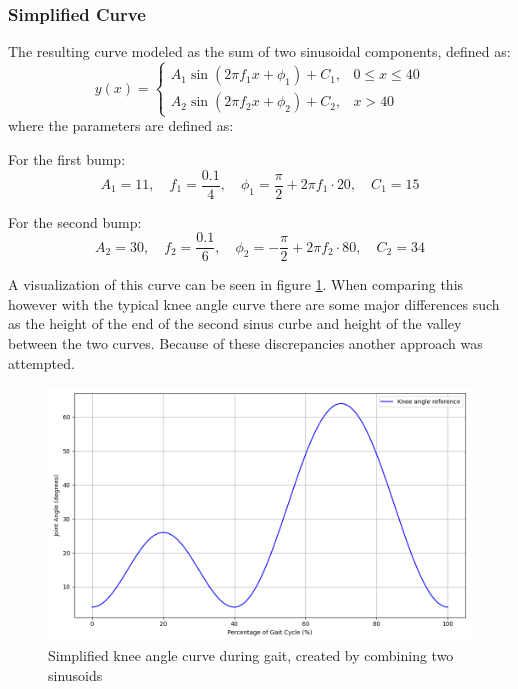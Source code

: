 \subsubsection{Simplified Curve}
The resulting curve modeled as the sum of two sinusoidal components, defined as:
\[
y(x) =
\begin{cases}
A_1 \sin\left(2 \pi f_1 x + \phi_1\right) + C_1, & 0 \leq x \leq 40 \\
A_2 \sin\left(2 \pi f_2 x + \phi_2\right) + C_2, & x > 40
\end{cases}
\]
where the parameters are defined as:

For the first bump:
\[
A_1 = 11, \quad f_1 = \frac{0.1}{4}, \quad \phi_1 = \frac{\pi}{2} + 2\pi f_1 \cdot 20, \quad C_1 = 15
\]

For the second bump:
\[
A_2 = 30, \quad f_2 = \frac{0.1}{6}, \quad \phi_2 = -\frac{\pi}{2} + 2\pi f_2 \cdot 80, \quad C_2 = 34
\]


A visualization of this curve can be seen in figure \ref{fig:simplecurve}. When comparing this however with the typical knee angle curve there are some major differences such as the height of the end of the second sinus curbe and height of the valley between the two curves. Because of these discrepancies another approach was attempted.
\begin{figure} [h]
    \centering
    \includegraphics[width=0.8\linewidth]{images/simpleKneeAngle.png}
    \caption{Simplified knee angle curve during gait, created by combining two sinusoids}
    \label{fig:simplecurve}
\end{figure}

